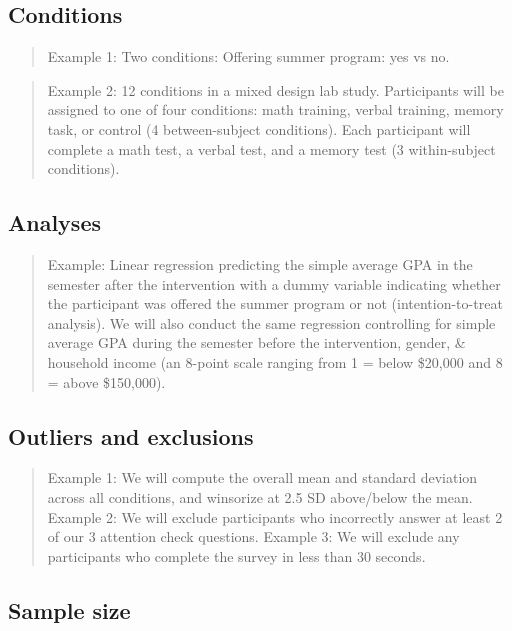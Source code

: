 \documentclass[]{article}
\newcounter{question}
\begin{document}
\hypertarget{conditions}{%
\subsection{Conditions}\label{conditions}}

\begin{quote}
Example 1: Two conditions: Offering summer program: yes vs no.
\end{quote}

\begin{quote}
Example 2: 12 conditions in a mixed design lab study. Participants will
be assigned to one of four conditions: math training, verbal training,
memory task, or control (4 between-subject conditions). Each participant
will complete a math test, a verbal test, and a memory test (3
within-subject conditions).
\end{quote}

\hypertarget{analyses}{%
\subsection{Analyses}\label{analyses}}

\begin{quote}
Example: Linear regression predicting the simple average GPA in the
semester after the intervention with a dummy variable indicating whether
the participant was offered the summer program or not
(intention-to-treat analysis). We will also conduct the same regression
controlling for simple average GPA during the semester before the
intervention, gender, \& household income (an 8-point scale ranging from
1 = below \$20,000 and 8 = above \$150,000).
\end{quote}

\hypertarget{outliers-and-exclusions}{%
\subsection{Outliers and exclusions}\label{outliers-and-exclusions}}

\begin{quote}
Example 1: We will compute the overall mean and standard deviation
across all conditions, and winsorize at 2.5 SD above/below the mean.
Example 2: We will exclude participants who incorrectly answer at least
2 of our 3 attention check questions. Example 3: We will exclude any
participants who complete the survey in less than 30 seconds.
\end{quote}

\hypertarget{sample-size}{%
\subsection{Sample size}\label{sample-size}}
\end{document}
